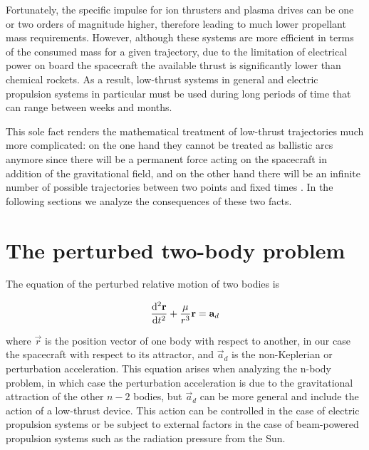 Fortunately, the specific impulse for ion thrusters and plasma drives can be one or two orders of magnitude higher, therefore leading to much lower propellant mass requirements. However, although these systems are more efficient in terms of the consumed mass for a given trajectory, due to the limitation of electrical power on board the spacecraft the available thrust is significantly lower than chemical rockets. As a result, low-thrust systems in general and electric propulsion systems in particular must be used during long periods of time that can range between weeks and months.

This sole fact renders the mathematical treatment of low-thrust trajectories much more complicated: on the one hand they cannot be treated as ballistic arcs anymore since there will be a permanent force acting on the spacecraft in addition of the gravitational field, and on the other hand there will be an infinite number of possible trajectories between two points and fixed times \cite{woodcock2002benefits}. In the following sections we analyze the consequences of these two facts.

\section{The perturbed two-body problem}

The equation of the perturbed relative motion of two bodies is \cite{battin1999introduction}

\begin{equation}
\deriv[2]{\vec{r}}{t} + \frac{\mu}{r^3} \vec{r} = \vec{a}_d
\label{eq:twobody}
\end{equation}


where $\vec{r}$ is the position vector of one body with respect to another, in our case the spacecraft with respect to its attractor, and $\vec{a}_d$ is the non-Keplerian or perturbation acceleration. This equation arises when analyzing the n-body problem, in which case the perturbation acceleration is due to the gravitational attraction of the other $n - 2$ bodies, but $\vec{a}_d$ can be more general and include the action of a low-thrust device. This action can be controlled in the case of electric propulsion systems or be subject to external factors in the case of beam-powered propulsion systems such as the radiation pressure from the Sun.
% 
% 
% 
% 

